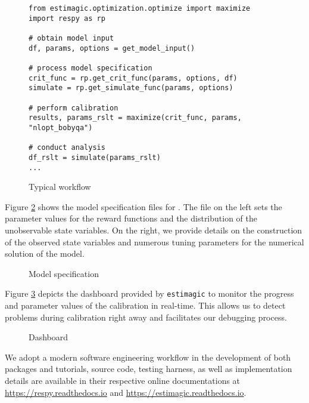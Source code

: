 \begin{figure}[ht!]\centering
\caption{Typical workflow}\label{Typical workflow}
\begin{lstlisting}
from estimagic.optimization.optimize import maximize
import respy as rp

# obtain model input
df, params, options = get_model_input()

# process model specification
crit_func = rp.get_crit_func(params, options, df)
simulate = rp.get_simulate_func(params, options)

# perform calibration
results, params_rslt = maximize(crit_func, params, "nlopt_bobyqa")

# conduct analysis
df_rslt = simulate(params_rslt)
...

\end{lstlisting}
\end{figure}\FloatBarrier

\noindent Figure \ref{Model specification} shows the model specification files for \citet{Keane.1994}. The file on the left sets the parameter values for the reward functions and the distribution of the unobservable state variables. On the right, we provide details on the construction of the observed state variables and numerous tuning parameters for the numerical solution of the model.

\begin{figure}[h!]\centering
\caption{Model specification}\label{Model specification}
\hspace{0.3cm}
\end{figure}\FloatBarrier

\noindent Figure \ref{Dashboard} depicts the dashboard provided by \verb+estimagic+ to monitor the progress and parameter values of the calibration in real-time. This allows us to detect problems during calibration right away and facilitates our debugging process.

\begin{figure}[h!]\centering
\caption{Dashboard}\label{Dashboard}
\end{figure}\FloatBarrier

\noindent We adopt a modern software engineering workflow in the development of both packages and tutorials, source code, testing harness, as well as implementation details are available in their respective online documentations at \url{https://respy.readthedocs.io} and \url{https://estimagic.readthedocs.io}.
